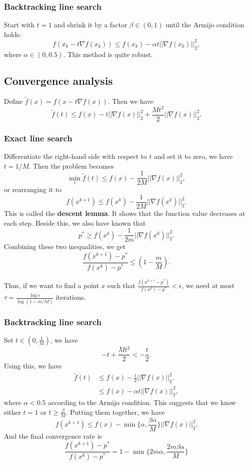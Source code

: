 \documentclass[lang=en,color=blue,mode=fancy,titlestyle=hang]{elegantbook}
\begin{document}
\subsubsection{Backtracking line search} Start with $t = 1$ and shrink it by a factor
$\beta \in (0, 1)$ until the Armijo condition holds:
\[
f(x_k - t \nabla f(x_k)) \leq f(x_k) - \alpha t ||\nabla f(x_k)||_2^2,
\]
where $\alpha \in (0, 0.5)$. This method is quite robust.

\subsection{Convergence analysis}
Define $\tilde{f}(x) = f(x - t \nabla f(x))$. Then we have
\[
\tilde{f}(t) \leq f(x) - t||\nabla f(x)||_2^2 + \frac{Mt^2}{2} ||\nabla f(x)||_2^2.
\]

\subsubsection{Exact line search} Differentiate the right-hand side with respect to $t$ and set it to
zero, we have $t = 1/M$. Then the problem becomes
\[
\min_t \tilde{f}(t) \leq f(x) - \frac{1}{2M} ||\nabla f(x)||_2^2,
\]
or rearranging it to
\[
f(x^{k+1}) \leq f(x^k) - \frac{1}{2M} ||\nabla f(x^k)||_2^2.
\]
This is called the \textbf{descent lemma}. It shows that the function value decreases at each step.
Beside this, we also have known that
\[
p^* \geq f(x^k) - \frac{1}{2m} ||\nabla f(x^k)||_2^2.
\]
Combining these two inequalities, we get
\[
\frac{f(x^{k+1}) - p^*}{f(x^k) - p^*} \leq (1 - \frac{m}{M}).
\]

Thus, if we want to find a point $x$ such that $\frac{f(x^{k+\tau}-p^*)}{f(x^k)-p^*} < \epsilon$,
we need at most $\tau = \frac{\log \epsilon}{\log (1 - m/M)}$ iterations.

\subsubsection{Backtracking line search} Set $t \in (0, \frac{1}{M})$, we have
\[
-t + \frac{Mt^2}{2} < -\frac{t}{2}.
\]
Using this, we have
\begin{align*}
\tilde{f}(t) &\leq f(x) - \frac{t}{2} ||\nabla f(x)||_2^2.\\
&\leq f(x) - \alpha t||\nabla f(x)||_2^2,
\end{align*}
where $\alpha <0.5$ according to the Armijo condition. This suggests that we know either $t = 1$
or $t \geq \frac{\beta}{M}$. Putting them together, we have
\[
f(x^{k+1}) \leq f(x) - \min\{\alpha, \frac{\beta \alpha}{M}\} ||\nabla f(x)||_2^2.
\]
And the final convergence rate is
\[
\frac{f(x^{k+1}) - p^*}{f(x^k) - p^*} = 1 - \min\{ 2m \alpha, \frac{2m \beta \alpha}{M} \}
\]
\end{document}
